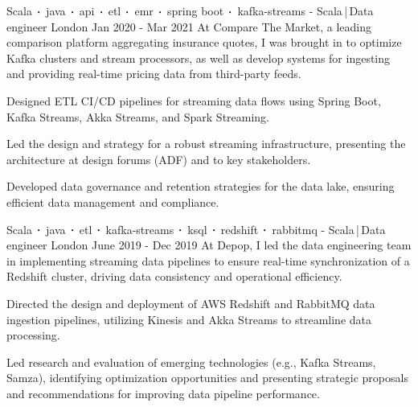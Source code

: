 \begin{cventries}
    \cventry
    {Scala$\sqbig$java$\sqbig$api$\sqbig$etl$\sqbig$emr$\sqbig$spring boot$\sqbig$kafka-streams}
    { - Scala\,|\,Data engineer}
    {London}
    {Jan 2020 - Mar 2021}
    {At Compare The Market, a leading comparison platform aggregating insurance quotes, I was brought in to optimize Kafka clusters and stream processors, as well as develop systems for ingesting and providing real-time pricing data from third-party feeds.}
    {
        \begin{cvitems}
            \item{Designed ETL CI/CD pipelines for streaming data flows using Spring Boot, Kafka Streams, Akka Streams, and Spark Streaming.}
            \item{Led the design and strategy for a robust streaming infrastructure, presenting the architecture at design forums (ADF) and to key stakeholders.}
            \item{Developed data governance and retention strategies for the data lake, ensuring efficient data management and compliance.}
        \end{cvitems}
    }

    \cventry
    {Scala$\sqbig$java$\sqbig$etl$\sqbig$kafka-streams$\sqbig$ksql$\sqbig$redshift$\sqbig$rabbitmq}
    { - Scala\,|\,Data engineer}
    {London}
    {June 2019 - Dec 2019}
    {At Depop, I led the data engineering team in implementing streaming data pipelines to ensure real-time synchronization of a Redshift cluster, driving data consistency and operational efficiency.}
    {
        \begin{cvitems}
            \item{Directed the design and deployment of AWS Redshift and RabbitMQ data ingestion pipelines, utilizing Kinesis and Akka Streams to streamline data processing.}
            \item{Led research and evaluation of emerging technologies (e.g., Kafka Streams, Samza), identifying optimization opportunities and presenting strategic proposals and recommendations for improving data pipeline performance.}
        \end{cvitems}
    }


\end{cventries}
